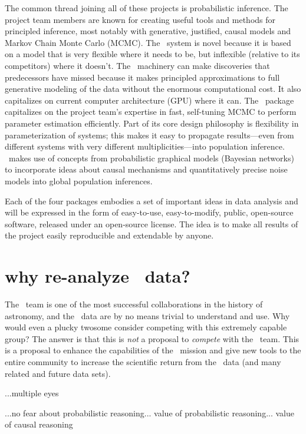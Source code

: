 \documentclass[letterpaper,12pt]{article}
\newcommand{\Untrendy}{\package{Untrendy}}
\newcommand{\Turnstyle}{\package{IronHorse}}
\newcommand{\Bart}{\package{Bart}}
\newcommand{\TheCreator}{\package{TheCreator}}
\begin{document}
The common thread joining all of these projects is probabilistic
inference.  The project team members are known for creating useful
tools and methods for principled inference, most notably with
generative, justified, causal models and Markov Chain Monte Carlo
(MCMC).  The \Untrendy\ system is novel because it is based on a model
that is very flexible where it needs to be, but inflexible (relative
to its competitors) where it doesn't.  The \Turnstyle\ machinery can
make discoveries that predecessors have missed because it makes
principled approximations to full generative modeling of the data
without the enormous computational cost.  It also capitalizes on
current computer architecture (GPU) where it can.  The \Bart\ package
capitalizes on the project team's expertise in fast, self-tuning MCMC
to perform parameter estimation efficiently.  Part of its core design
philosophy is flexibility in parameterization of systems; this makes
it easy to propagate results---even from different systems with very
different multiplicities---into population inference.
\TheCreator\ makes use of concepts from probabilistic graphical models
(Bayesian networks) to incorporate ideas about causal mechanisms and
quantitatively precise noise models into global population inferences.

Each of the four packages embodies a set of important ideas in data
analysis and will be expressed in the form of easy-to-use,
easy-to-modify, public, open-source software, released under an
open-source license.  The idea is to make all results of the project
easily reproducible and extendable by anyone.

\section{why re-analyze \Kepler\ data?}

The \Kepler\ team is one of the most successful collaborations in the
history of astronomy, and the \Kepler\ data are by no means trivial to
understand and use.  Why would even a plucky twosome consider
competing with this extremely capable group?  The answer is that this
is \emph{not} a proposal to \emph{compete} with the \Kepler\ team.
This is a proposal to enhance the capabilities of the \Kepler\ mission
and give new tools to the entire community to increase the scientific
return from the \Kepler\ data (and many related and future data sets).

...multiple eyes

...no fear about probabilistic reasoning... value of probabilistic reasoning... value of causal reasoning
\end{document}
